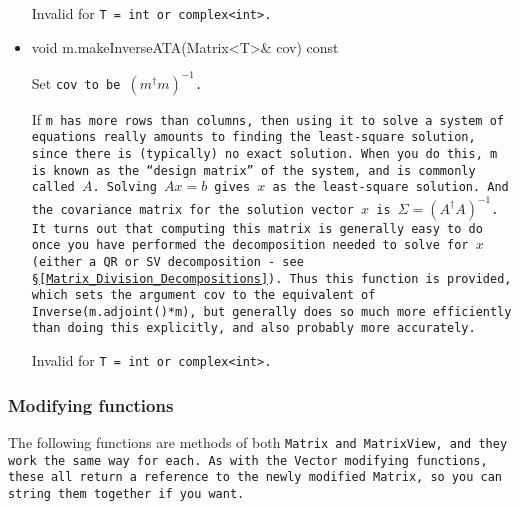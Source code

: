 \begin{itemize}
Invalid for \tt{T = int} or \tt{complex<int>}.

\item
\begin{tmvcode}
void m.makeInverseATA(Matrix<T>& cov) const
\end{tmvcode}
Set \tt{cov} to be $(m^\dagger m)^{-1}$.  

If \tt{m} has more rows than columns, then using it to solve a system of equations
really amounts to finding the least-square solution, since there is (typically) no
exact solution.  When you do this, \tt{m} is known as the ``design matrix'' of the system,
and is commonly called $A$.  Solving $A x=b$ gives $x$ as the least-square 
solution.  And the covariance matrix for the solution vector $x$ is 
$\Sigma = (A^\dagger A)^{-1}$.
It turns out that computing this matrix is generally easy to do once you have 
performed the decomposition needed to solve for $x$ (either a QR or SV 
decomposition - see \S\ref{Matrix_Division_Decompositions}).  
Thus this function is provided, which sets the
argument \tt{cov} to the equivalent of \tt{Inverse(m.adjoint()*m)}, 
but generally does so much more efficiently than doing this explicitly, 
and also probably more accurately.

Invalid for \tt{T = int} or \tt{complex<int>}.

\end{itemize}

\subsubsection{Modifying functions}

The following functions are methods of both \tt{Matrix} and \tt{MatrixView},
and they work the same way for each.
As with the \tt{Vector} modifying functions, these all return a reference
to the newly modified \tt{Matrix}, so you can string them together if you want.

